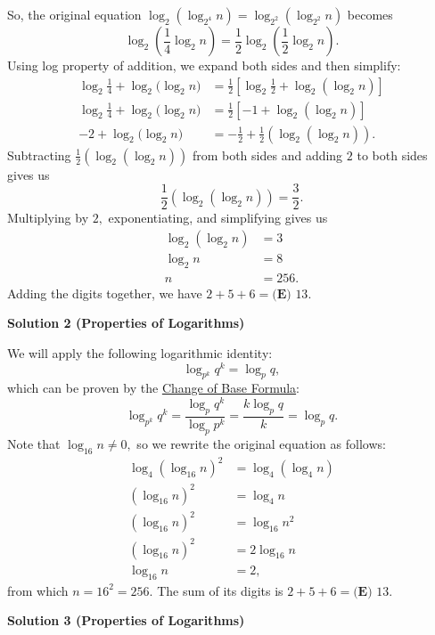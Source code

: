 \begin{enumerate}
 So, the original equation $\log_2{(\log_{2^4}{n})} = \log_{2^2}{(\log_{2^2}{n})}$ becomes 
 \[\log_2\left({\frac{1}{4}\log_{2}{n}}\right) = \frac{1}{2}\log_2\left({\frac{1}{2}\log_2{n}}\right).\]Using log property of addition, we expand both sides and then simplify:
 \begin{align*} \log_2{\frac{1}{4}}+\log_2{(\log_{2}{n}}) &= \frac{1}{2}\left[\log_2{\frac{1}{2}} +\log_{2}{(\log_2{n})}\right] \\ \log_2{\frac{1}{4}}+\log_2{(\log_{2}{n}}) &= \frac{1}{2}\left[-1 +\log_{2}{(\log_2{n})}\right] \\ -2+\log_2{(\log_{2}{n}}) &= -\frac{1}{2}+ \frac{1}{2}(\log_{2}{(\log_2{n})}). \end{align*}
Subtracting $\frac{1}{2}(\log_{2}{(\log_2{n})})$ from both sides and adding $2$ to both sides gives us 
 \[\frac{1}{2}(\log_{2}{(\log_2{n})}) = \frac{3}{2}.\]Multiplying by $2,$ exponentiating, and simplifying gives us
 \begin{align*} \log_{2}{(\log_2{n})} &= 3 \\ \log_2{n}&=8 \\ n&=256. \end{align*}
Adding the digits together, we have $2+5+6=\boxed{\textbf{(E) } 13}.$




\textbf{Solution 2 (Properties of Logarithms)}

We will apply the following logarithmic identity:
 \[\log_{p^k}{q^k}=\log_{p}{q},\]which can be proven by the \href{https://artofproblemsolving.com/wiki/index.php?title=Change\_of\_base\_formula}{ Change of Base Formula}: 
 \[\log_{p^k}{q^k}=\frac{\log_{p}{q^k}}{\log_{p}{p^k}}=\frac{k\log_{p}{q}}{k}=\log_{p}{q}.\]Note that $\log_{16}{n}\neq0,$ so we rewrite the original equation as follows:
 \begin{align*} \log_4{(\log_{16}{n})^2}&=\log_4{(\log_4{n})} \\ (\log_{16}{n})^2&=\log_4{n} \\ (\log_{16}{n})^2&=\log_{16}{n^2} \\ (\log_{16}{n})^2&=2\log_{16}{n} \\ \log_{16}{n}&=2, \end{align*}
from which $n=16^2=256.$ The sum of its digits is $2+5+6=\boxed{\textbf{(E) } 13}.$




\textbf{Solution 3 (Properties of Logarithms)}


\end{enumerate}
